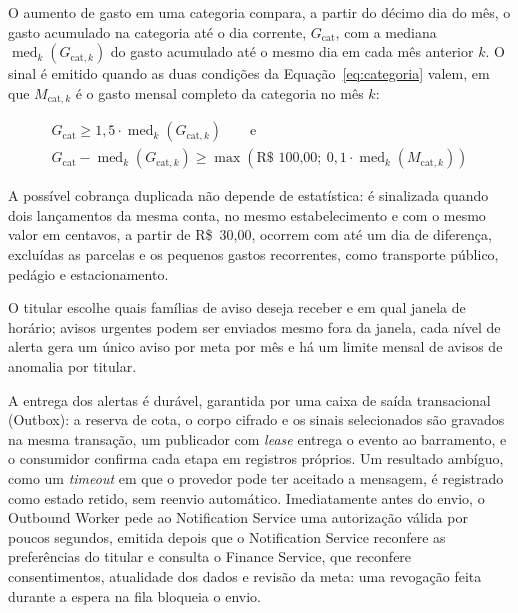 O aumento de gasto em uma categoria compara, a partir do décimo dia do mês, o gasto acumulado na categoria até o dia corrente, $G_{\mathrm{cat}}$, com a mediana $\operatorname{med}_k\left(G_{\mathrm{cat},k}\right)$ do gasto acumulado até o mesmo dia em cada mês anterior $k$. O sinal é emitido quando as duas condições da Equação~\ref{eq:categoria} valem, em que $M_{\mathrm{cat},k}$ é o gasto mensal completo da categoria no mês $k$:

\begin{equation}
\begin{gathered}
G_{\mathrm{cat}} \ge 1{,}5 \cdot \operatorname{med}_k\left(G_{\mathrm{cat},k}\right)
\qquad \text{e} \\
G_{\mathrm{cat}} - \operatorname{med}_k\left(G_{\mathrm{cat},k}\right) \ge \max\left(\text{R\$~100,00};\ 0{,}1 \cdot \operatorname{med}_k\left(M_{\mathrm{cat},k}\right)\right)
\end{gathered}
\label{eq:categoria}
\end{equation}

A possível cobrança duplicada não depende de estatística: é sinalizada quando dois lançamentos da mesma conta, no mesmo estabelecimento e com o mesmo valor em centavos, a partir de R\$~30,00, ocorrem com até um dia de diferença, excluídas as parcelas e os pequenos gastos recorrentes, como transporte público, pedágio e estacionamento.

O titular escolhe quais famílias de aviso deseja receber e em qual janela de horário; avisos urgentes podem ser enviados mesmo fora da janela, cada nível de alerta gera um único aviso por meta por mês e há um limite mensal de avisos de anomalia por titular.

A entrega dos alertas é durável, garantida por uma caixa de saída transacional (Outbox): a reserva de cota, o corpo cifrado e os sinais selecionados são gravados na mesma transação, um publicador com \textit{lease} entrega o evento ao barramento, e o consumidor confirma cada etapa em registros próprios. Um resultado ambíguo, como um \textit{timeout} em que o provedor pode ter aceitado a mensagem, é registrado como estado retido, sem reenvio automático. Imediatamente antes do envio, o Outbound Worker pede ao Notification Service uma autorização válida por poucos segundos, emitida depois que o Notification Service reconfere as preferências do titular e consulta o Finance Service, que reconfere consentimentos, atualidade dos dados e revisão da meta: uma revogação feita durante a espera na fila bloqueia o envio.

